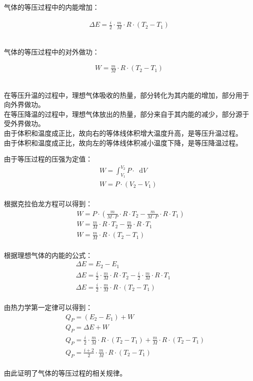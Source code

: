 \documentclass[UTF8]{ctexart}
\newcommand*{\dif}{\mathop{}\!\mathrm{d}}
\begin{document}
    气体的等压过程中的内能增加：
    \begin{large}
        \begin{align*}
            &\Delta E=\frac{i}{2}\cdot\frac{m}{M}\cdot R\cdot(T_2-T_1)
        \end{align*}
    \end{large}\\
    气体的等压过程中的对外做功：
    \begin{large}
        \begin{align*}
            &W=\frac{m}{M}\cdot R\cdot(T_2-T_1)
        \end{align*}
    \end{large}\\
    在等压升温的过程中，理想气体吸收的热量，部分转化为其内能的增加，部分用于向外界做功。\\[3mm]
    在等压降温的过程中，理想气体放出的热量，部分来自于其内能的减少，部分源于受外界做功。\\[3mm]
    由于体积和温度成正比，故向右的等体线体积增大温度升高，是等压升温过程。\\[3mm]
    由于体积和温度成正比，故向左的等体线体积减小温度下降，是等压降温过程。

\newpage

    由于等压过程的压强为定值：
    \begin{align}
        &W=\int_{V_1}^{V_2} P\cdot\dif V~~~~~~~~\\[4mm]
        &W=P\cdot(V_2-V_1)
    \end{align}\\
    根据克拉伯龙方程可以得到：
    \begin{align}
        &~~W=P\cdot\left(\frac{m}{M\cdot P}\cdot R\cdot T_2-\frac{m}{M\cdot P}\cdot R\cdot T_1\right)\\[4mm]
        &~~W=\frac{m}{M}\cdot R\cdot T_2-\frac{m}{M}\cdot R\cdot T_1\\[4mm]
        &~~W=\frac{m}{M}\cdot R\cdot (T_2-T_1)
    \end{align}\\
    根据理想气体的内能的公式：
    \begin{align}
        &\Delta E=E_2-E_1\\[4mm]
        &\Delta E=\frac{i}{2}\cdot\frac{m}{M}\cdot R\cdot T_2-\frac{i}{2}\cdot\frac{m}{M}\cdot R\cdot T_1~~~~~~~~\\[4mm]
        &\Delta E=\frac{i}{2}\cdot\frac{m}{M}\cdot R\cdot (T_2-T_1)
    \end{align}\\
    由热力学第一定律可以得到：
    \begin{align}
        &~~~~~~~~Q_P=(E_2-E_1)+W\\[4mm]
        &~~~~~~~~Q_P=\Delta E+W\\[4mm]
        &~~~~~~~~Q_P=\frac{i}{2}\cdot\frac{m}{M}\cdot R\cdot(T_2-T_1)+\frac{m}{M}\cdot R\cdot(T_2-T_1)\\[4mm]
        &~~~~~~~~Q_P=\frac{i+2}{2}\cdot\frac{m}{M}\cdot R\cdot(T_2-T_1)
    \end{align}\\
    由此证明了气体的等压过程的相关规律。
\end{document}
